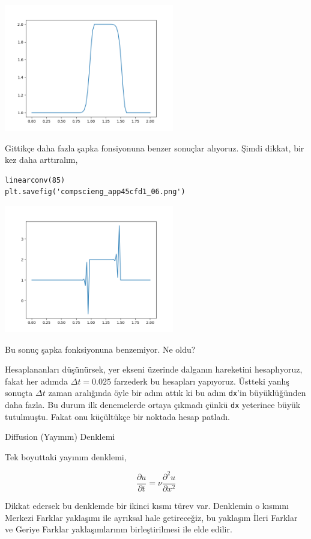 \documentclass[12pt,fleqn]{article}\usepackage{../../common}
\begin{document}
\includegraphics[width=20em]{compscieng_app45cfd1_05.png}

Gittikçe daha fazla şapka fonsiyonuna benzer sonuçlar alıyoruz. Şimdi dikkat,
bir kez daha arttıralım,

\begin{verbatim}
linearconv(85)
plt.savefig('compscieng_app45cfd1_06.png')
\end{verbatim}

\includegraphics[width=20em]{compscieng_app45cfd1_06.png}

Bu sonuç şapka fonksiyonuna benzemiyor. Ne oldu?

Hesaplananları düşünürsek, yer ekseni üzerinde dalganın hareketini hesaplıyoruz,
fakat her adımda $\Delta t = 0.025$ farzederk bu hesapları yapıyoruz. Üstteki
yanlış sonuçta $\Delta t$ zaman aralığında öyle bir adım attık ki bu adım
\verb!dx!'in büyüklüğünden daha fazla. Bu durum ilk denemelerde ortaya çıkmadı
çünkü \verb!dx! yeterince büyük tutulmuştu. Fakat onu küçültükçe bir noktada
hesap patladı.

Diffusion (Yayınım) Denklemi

Tek boyuttaki yayınım denklemi,

$$
\frac{\partial u}{\partial t} = \nu \frac{\partial^2 u}{\partial x^2}
$$

Dikkat edersek bu denklemde bir ikinci kısmı türev var. Denklemin o
kısmını Merkezi Farklar yaklaşımı ile ayrıksal hale getireceğiz, bu
yaklaşım İleri Farklar ve Geriye Farklar yaklaşımlarının birleştirilmesi ile
elde edilir.
\end{document}
